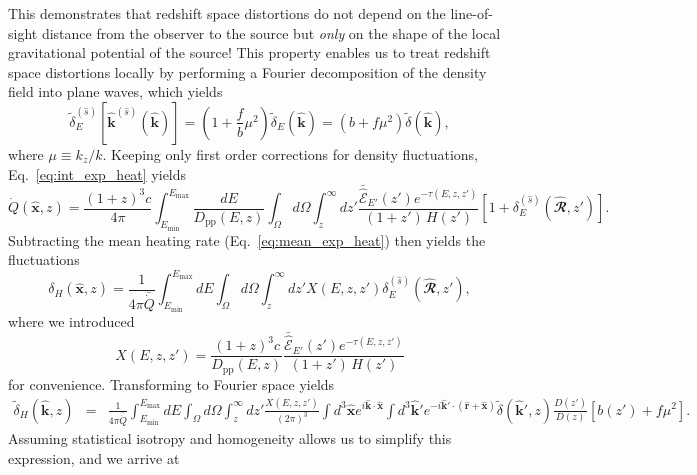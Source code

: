 \documentclass[numberedappendix]{emulateapj}
\newcommand{\calR}{\ensuremath{\bm\hat{\mathbfcal{R}}}}
\begin{document}
This demonstrates that redshift space distortions do not depend on the line-of-sight distance from the observer to the source but {\em only} on the shape of the local gravitational potential of the source! This property enables us to treat redshift space distortions locally by performing a Fourier decomposition of the density field into plane waves, which yields
\begin{equation}
  \label{eq:real_vs_z2}
  \tilde{\delta}_E^{(\hat s)}\left[\mathbf{\hat{k}}^{(\hat s)}(\mathbf{\hat{k}})\right]=
  \left(1+\frac{f}{b}\mu^2\right) \tilde{\delta}_E(\mathbf{\hat{k}})=
  \left(b+f\mu^2\right) \tilde{\delta}(\mathbf{\hat{k}}),
\end{equation}
where $\mu\equiv k_z/k$. Keeping only first order corrections for density fluctuations, Eq.~\eqref{eq:int_exp_heat} yields
\begin{equation}
\label{eq:mean_heat0}
\dot{Q}(\mathbf{\hat{x}},z)=
\frac{(1+z)^3c}{4\pi }\int_{E_{\mathrm{min}}}^{E_{\mathrm{max}}}\frac{dE}{D_{\mathrm{pp}}(E,z)}
\int_{\Omega}d\Omega\int_z^{\infty} dz'\frac{\mathcal{\bar{\hat E}}_{E'}(z')e^{-\tau(E,z,z')}}{(1+z')\,H(z')}
\left[1+\delta_E^{(\hat s)}(\calR,z')\right].
\end{equation}
Subtracting the mean heating rate (Eq.~\eqref{eq:mean_exp_heat}) then yields the fluctuations
\begin{equation}
\label{eq:heat_fluc0}
\delta_H(\mathbf{\hat{x}}, z)=\frac{1}{4\pi\bar{\dot{Q}}}\int_{E_{\mathrm{min}}}^{E_{\mathrm{max}}} dE
\int_{\Omega}d\Omega\int_z^{\infty}dz'X(E,z,z')\delta_E^{(\hat s)}(\calR,z'),
\end{equation}
where we introduced
\begin{equation}
\label{eq:def_X}
X(E,z,z')=\frac{(1+z)^3c}{D_{\mathrm{pp}}(E,z)}\frac{\mathcal{\bar{\hat E}}_{E'}(z')e^{-\tau(E,z,z')}}{(1+z')\,H(z')}
\end{equation}
for convenience. Transforming to Fourier space yields
\begin{eqnarray}
\label{eq:heat_fluc0}
\tilde{\delta}_H(\mathbf{\hat k}, z)&=&\frac{1}{4\pi\bar{\dot{Q}}}\int_{E_{\mathrm{min}}}^{E_{\mathrm{max}}} dE\int_{\Omega}
\!d\Omega\int_z^{\infty}\! dz'
\frac{X(E,z,z')}{(2\pi)^3}\!\int d^3\mathbf{\hat x}e^{i\mathbf{\hat k \cdot \hat x}}
\int\! d^3 \mathbf{\hat k'}e^{-i\mathbf {\hat k'} \cdot (\mathbf{\hat r} +\mathbf{ \hat x})} 
\tilde\delta(\mathbf {\hat k'}, z)\frac{D(z')}{D(z)}\left[b(z') + f \mu^2\right].
\end{eqnarray}
Assuming statistical isotropy and homogeneity allows us to simplify this expression, and we arrive at
\end{document}
